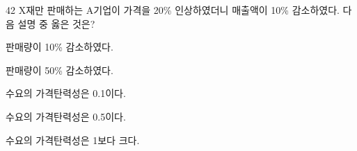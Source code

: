 \begin{question}{42}
X재만 판매하는 A기업이 가격을 20\% 인상하였더니 매출액이 10\% 감소하였다. 다음 설명 중 옳은 것은?
\begin{choices}
  \item 판매량이 10\% 감소하였다.
  \item 판매량이 50\% 감소하였다.
  \item 수요의 가격탄력성은 0.1이다.
  \item 수요의 가격탄력성은 0.5이다.
  \item 수요의 가격탄력성은 1보다 크다.
\end{choices}
\end{question}
